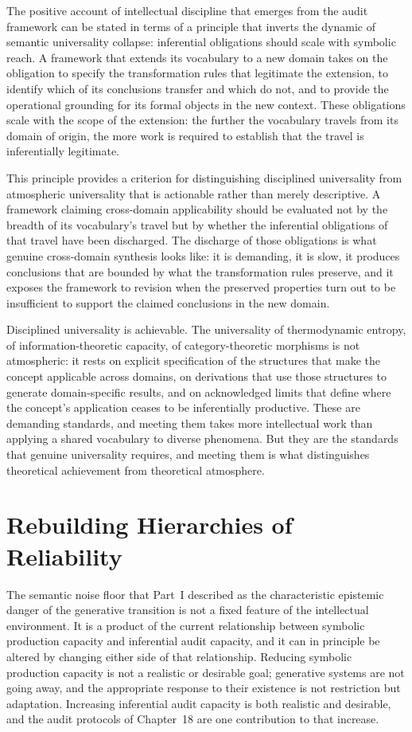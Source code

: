 \documentclass[12pt, openright, twoside]{book}
\begin{document}
The positive account of intellectual discipline that emerges from the audit
framework can be stated in terms of a principle that inverts the dynamic
of semantic universality collapse: inferential obligations should scale
with symbolic reach. A framework that extends its vocabulary to a new domain
takes on the obligation to specify the transformation rules that legitimate
the extension, to identify which of its conclusions transfer and which do
not, and to provide the operational grounding for its formal objects in
the new context. These obligations scale with the scope of the extension:
the further the vocabulary travels from its domain of origin, the more
work is required to establish that the travel is inferentially legitimate.

This principle provides a criterion for distinguishing disciplined universality
from atmospheric universality that is actionable rather than merely
descriptive. A framework claiming cross-domain applicability should be
evaluated not by the breadth of its vocabulary's travel but by whether
the inferential obligations of that travel have been discharged. The
discharge of those obligations is what genuine cross-domain synthesis
looks like: it is demanding, it is slow, it produces conclusions that
are bounded by what the transformation rules preserve, and it exposes
the framework to revision when the preserved properties turn out to be
insufficient to support the claimed conclusions in the new domain.

Disciplined universality is achievable. The universality of thermodynamic
entropy, of information-theoretic capacity, of category-theoretic morphisms
is not atmospheric: it rests on explicit specification of the structures
that make the concept applicable across domains, on derivations that
use those structures to generate domain-specific results, and on
acknowledged limits that define where the concept's application ceases
to be inferentially productive. These are demanding standards, and meeting
them takes more intellectual work than applying a shared vocabulary to
diverse phenomena. But they are the standards that genuine universality
requires, and meeting them is what distinguishes theoretical achievement
from theoretical atmosphere.

\section{Rebuilding Hierarchies of Reliability}

The semantic noise floor that Part~I described as the characteristic
epistemic danger of the generative transition is not a fixed feature of
the intellectual environment. It is a product of the current relationship
between symbolic production capacity and inferential audit capacity, and
it can in principle be altered by changing either side of that relationship.
Reducing symbolic production capacity is not a realistic or desirable goal;
generative systems are not going away, and the appropriate response to
their existence is not restriction but adaptation. Increasing inferential
audit capacity is both realistic and desirable, and the audit protocols
of Chapter~18 are one contribution to that increase.
\end{document}
